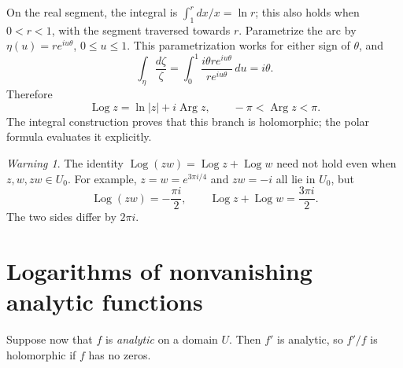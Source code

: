 \documentclass[11pt]{article}
\theoremstyle{plain}
\theoremstyle{definition}
\theoremstyle{remark}
\newtheorem*{warning}{Warning}
\numberwithin{equation}{section}
\DeclareMathOperator{\Log}{Log}
\DeclareMathOperator{\Arg}{Arg}
\newenvironment{lecturefigure}
 {\par\addvspace{0.25em}\begingroup\setlength{\parskip}{0pt}\centering}
 {\par\endgroup\addvspace{0.25em}}
\begin{document}
\begin{lecturefigure}
\end{lecturefigure}
On the real segment, the integral is $\int_1^r dx/x=\ln r$;
this also holds when $0<r<1$, with the segment traversed towards $r$.
Parametrize the arc by $\eta(u)=re^{iu\theta}$, $0\leq u\leq1$.
This parametrization works for either sign of $\theta$, and
\[
 \int_\eta\frac{d\zeta}{\zeta}
 =\int_0^1\frac{i\theta re^{iu\theta}}{re^{iu\theta}}\,du=i\theta.
\]
Therefore
\[
 \boxed{\Log z=\ln|z|+i\Arg z,\qquad -\pi<\Arg z<\pi.}
\]
The integral construction proves that this branch is holomorphic;
the polar formula evaluates it explicitly.

\begin{warning}
The identity $\Log(zw)=\Log z+\Log w$ need not hold even when
$z,w,zw\in U_0$. For example, $z=w=e^{3\pi i/4}$ and $zw=-i$ all lie in $U_0$,
but
\[
 \Log(zw)=-\frac{\pi i}{2},\qquad \Log z+\Log w=\frac{3\pi i}{2}.
\]
The two sides differ by $2\pi i$.
\end{warning}

\section{Logarithms of nonvanishing analytic functions}
Suppose now that $f$ is \emph{analytic} on a domain $U$. Then $f'$ is
analytic, so $f'/f$ is holomorphic if $f$ has no zeros.
\end{document}
